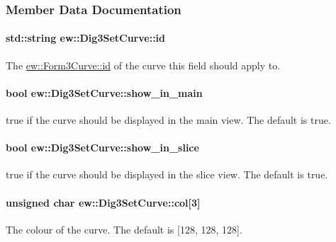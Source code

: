 \subsubsection{Member Data Documentation}
\hypertarget{classew_1_1Dig3SetCurve_a2e33ff75ce3983664e36a8ef6743cb87}{
\paragraph[{id}]{\setlength{\rightskip}{0pt plus 5cm}std::string {\bf ew::Dig3SetCurve::id}}\hfill}
\label{classew_1_1Dig3SetCurve_a2e33ff75ce3983664e36a8ef6743cb87}
The \hyperlink{classew_1_1Form3Curve_a2bb3648bb9d075b67572de31ceb4f9c9}{ew::Form3Curve::id} of the curve this field should apply to. \hypertarget{classew_1_1Dig3SetCurve_a863b47d06046cf374792227495b92fb0}{
\paragraph[{show\_\-in\_\-main}]{\setlength{\rightskip}{0pt plus 5cm}bool {\bf ew::Dig3SetCurve::show\_\-in\_\-main}}\hfill}
\label{classew_1_1Dig3SetCurve_a863b47d06046cf374792227495b92fb0}
{\ttfamily true} if the curve should be displayed in the main view. The default is {\ttfamily true}. \hypertarget{classew_1_1Dig3SetCurve_af653d84915b2581c139d6928c2943d00}{
\paragraph[{show\_\-in\_\-slice}]{\setlength{\rightskip}{0pt plus 5cm}bool {\bf ew::Dig3SetCurve::show\_\-in\_\-slice}}\hfill}
\label{classew_1_1Dig3SetCurve_af653d84915b2581c139d6928c2943d00}
{\ttfamily true} if the curve should be displayed in the slice view. The default is {\ttfamily true}. \hypertarget{classew_1_1Dig3SetCurve_a92f3ffc02cb571c898a0f5af2ba6a096}{
\paragraph[{col}]{\setlength{\rightskip}{0pt plus 5cm}unsigned char {\bf ew::Dig3SetCurve::col}\mbox{[}3\mbox{]}}\hfill}
\label{classew_1_1Dig3SetCurve_a92f3ffc02cb571c898a0f5af2ba6a096}
The colour of the curve. The default is \mbox{[}128, 128, 128\mbox{]}. 